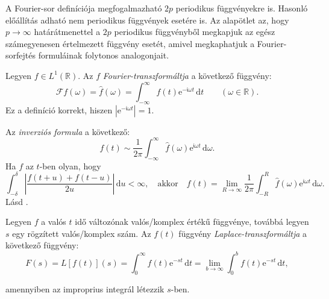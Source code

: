 \documentclass[DIV=15,appendixprefix]{scrreprt}
\theoremstyle{definition}
\theoremstyle{remark}
\newcommand{\imag}{\mathfrak{i}}
\begin{document}
A Fourier-sor definíciója megfogalmazható $ 2 p $ periodikus függvényekre is. Hasonló előállítás
adható nem periodikus függvények esetére is. Az alapötlet az, hogy $ p \rightarrow \infty $
határátmenettel a $ 2 p $ periodikus függvényből megkapjuk az egész számegyenesen értelmezett
függvény esetét, amivel megkaphatjuk a Fourier-sorfejtés formuláinak folytonos analogonjait.

Legyen $ f \in L^{ 1 } \left( \mathbb{ R } \right) $. Az $ f $ \emph{Fourier-transzformáltja} a
következő függvény:
\begin{equation*}
	\mathcal{ F } f \left( \omega \right) = \hat{ f } \left( \omega \right)  = \int_{ - \infty }^{
	\infty } f \left( t \right)
	\mathrm{ e }^{ - \imag \omega t } \, \mathrm{ d } t \qquad \left( \omega \in \mathbb{ R }
	\right).
\end{equation*}
Ez a definíció korrekt, hiszen $ \left| \mathrm{ e }^{ - \imag \omega t } \right| = 1 $.

Az \emph{inverziós formula} a következő:
\begin{equation*}
	f \left( t \right) \sim \frac{ 1 }{ 2 \pi } \int_{ - \infty }^{ \infty } \hat{ f } \left( \omega
	\right) \mathrm{ e }^{ \imag \omega t } \, \mathrm{ d } \omega.
\end{equation*}
Ha $ f $ az $ t $-ben olyan, hogy
\begin{equation*}
	\int_{ - \delta }^{ \delta } \left| \frac{f \left( t + u \right) + f \left( t - u \right) }{ 2
	u } \right| \, \mathrm{ d } u < \infty, \quad \text{akkor} \quad f \left( t \right) = \lim_{ R
	\rightarrow \infty } \frac{ 1 }{ 2 \pi } \int_{ - R }^{ R } \hat{ f } \left( \omega
	\right)\mathrm{ e }^{ \imag \omega t } \, \mathrm{ d }\omega.
\end{equation*}
%
Lásd \cite[6.1--6.4~szakaszok]{SzTNZ}.

Legyen $ f $ a valós $ t $ idő változónak valós/komplex értékű függvénye, továbbá legyen $ s $ egy
rögzített valós/komplex szám. Az $ f \left( t \right) $ függvény \emph{Laplace-transzformáltja} a
következő függvény:
\begin{equation*}
	F \left( s \right) = L \left[ f \left( t \right) \right] \left( s \right) =
	\int_{ 0 }^{ \infty } f \left( t \right) \mathrm{ e }^{ - s t } \, \mathrm{ d } t =
	\lim_{ b \rightarrow \infty } \int_{ 0 }^{ b } f \left( t \right) \mathrm{ e }^{ - s t } \,
	\mathrm{ d } t,
\end{equation*}

amennyiben az improprius integrál létezzik $ s $-ben.
\end{document}
